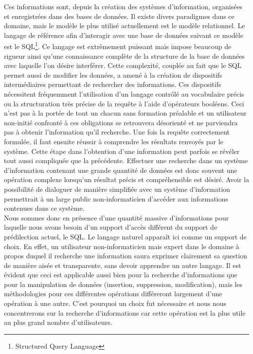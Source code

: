 \documentclass[a4paper,12pt]{article}
\begin{document}
Ces informations sont, depuis la création des systèmes d'information, organisées et enregistrées dans des bases de données.
Il existe divers paradigmes dans ce domaine, mais le modèle le plus utilisé actuellement est le modèle relationnel.
Le langage de référence afin d'interagir avec une base de données suivant ce modèle est le SQL\footnote{Structured Query Language}.
Ce langage est extrêmement puissant mais impose beaucoup de rigueur ainsi qu'une connaissance complète de la structure de la base de données avec laquelle l'on désire interférer.
Cette complexité, couplée au fait que le SQL permet aussi de modifier les données, a amené à la création de dispositifs intermédiaires permettant de rechercher des informations.
Ces dispositifs nécessitent fréquemment l'utilisation d'un langage contrôlé au vocabulaire précis ou la structuration très précise de la requête à l'aide d'opérateurs booléens. 
Ceci n'est pas à la portée de tout un chacun sans formation préalable et un utilisateur non-initié confronté à ces obligations se retrouvera désorienté et ne parviendra pas à obtenir l'information qu'il recherche. 
Une fois la requête correctement formulée, il faut ensuite réussir à comprendre les résultats renvoyés par le système.
Cette étape dans l'obtention d'une information peut parfois se révéler tout aussi compliquée que la précédente.
Effectuer une recherche dans un système d'information contenant une grande quantité de données est donc souvent une opération complexe lorsqu'un résultat précis et compréhensible est désiré.
Avoir la possibilité de dialoguer de manière simplifiée avec un système d'information permettrait à un large public non-informaticien d'accéder aux informations contenues dans ce système. \\

Nous sommes donc en présence d'une quantité massive d'informations pour laquelle nous avons besoin d'un support d'accès différent du support de prédilection actuel, le SQL. 
Le langage naturel apparaît ici comme un support de choix.
En effet, un utilisateur non-informaticien mais expert dans le domaine à propos duquel il recherche une information saura exprimer clairement sa question de manière aisée et transparente, sans devoir apprendre un autre langage. 
Il est évident que ceci est applicable aussi bien pour la recherche d'informations que pour la manipulation de données (insertion, suppression, modification), mais les méthodologies pour ces différentes opérations différeront largement d'une opération à une autre.
C'est pourquoi un choix fut nécessaire et nous nous concentrerons sur la recherche d'informations car cette opération est la plus utile au plus grand nombre d'utilisateurs. \\
\end{document}
